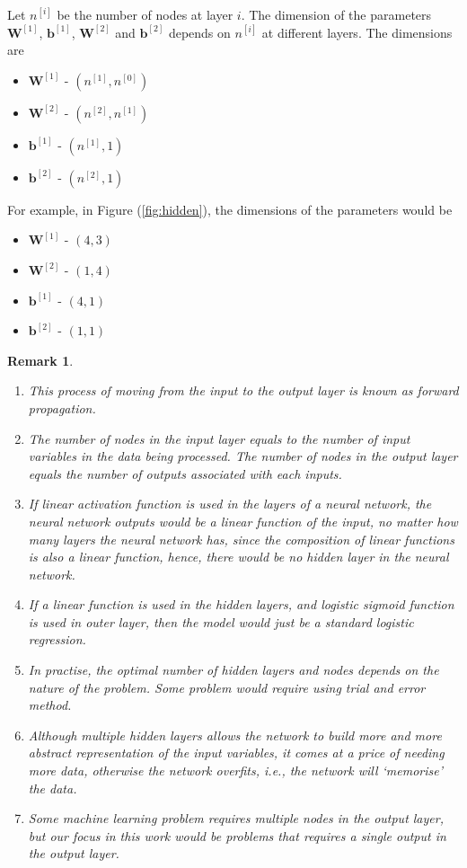 \documentclass[12pt]{report}
\newtheorem{rem}{Remark}[]
\numberwithin{equation}{section}
\begin{document}
Let $n^{[i]}$ be the number of nodes at layer $i$. The dimension of the parameters $\bm{W}^{[1]}$, $\bm{b}^{[1]}$, $\bm{W}^{[2]}$ and $\bm{b}^{[2]}$ depends on $n^{[i]}$ at different layers. The dimensions are 
\begin{multicols}{2}
\begin{itemize}[label=-]
\item $\bm{W}^{[1]}$ - $(n^{[1]},n^{[0]})$
\item $\bm{W}^{[2]}$ - $(n^{[2]},n^{[1]})$
\item $\bm{b}^{[1]}$ - $(n^{[1]},1)$
\item $\bm{b}^{[2]}$ - $(n^{[2]},1)$
\end{itemize}
\end{multicols}
\noindent For example, in Figure (\ref{fig:hidden}), the dimensions of the parameters would be
\begin{multicols}{2}
\begin{itemize}[label=-]
\item $\bm{W}^{[1]}$ - $(4,3)$
\item $\bm{W}^{[2]}$ - $(1,4)$
\item $\bm{b}^{[1]}$ - $(4,1)$
\item $\bm{b}^{[2]}$ - $(1,1)$
\end{itemize}
\end{multicols}
\begin{rem}
\normalfont 
\begin{enumerate}
\item This process of moving from the input to the output layer is known as {forward propagation}.
\item The number of nodes in the input layer equals to the number of input variables in the data being processed. The number of nodes in the output layer equals the number of outputs associated with each inputs. 
\item If linear activation function is used in the layers of a neural network, the neural network outputs would be a linear function of the input, no matter how many layers the neural network has, since the composition of linear functions is also a linear function, hence, there would be no hidden layer in the neural network.
\item If a linear function is used in the hidden layers, and logistic sigmoid function is used in outer layer, then the model would just be a standard logistic regression.
\item In practise, the optimal number of hidden layers and nodes depends on the nature of the problem. Some problem would require using trial and error method.
\item Although multiple hidden layers allows the network to build more and more abstract representation of the input variables, it comes at a price of needing more data, otherwise the network overfits, i.e., the network will `memorise' the data.
\item Some machine learning problem requires multiple nodes in the output layer, but our focus in this work would be problems that requires a single output in the output layer.
\end{enumerate}
\end{rem}
\end{document}
